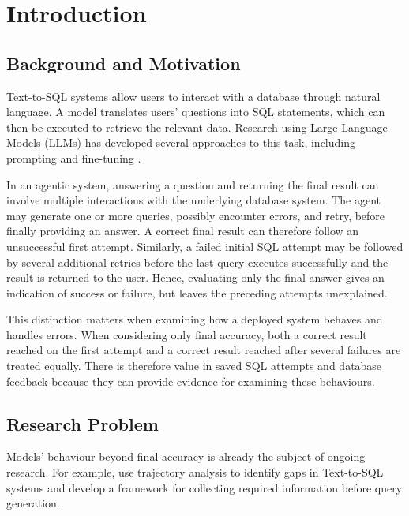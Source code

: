 \section{Introduction}
\label{sec:introduction}

\subsection{Background and Motivation}
\label{sec:introduction-background}

Text-to-SQL systems allow users to interact with a database through natural language. 
A model translates users' questions into SQL statements, 
which can then be executed to retrieve the relevant data. 
Research using Large Language Models (LLMs) has developed several approaches to this task, 
including prompting and fine-tuning \citep{shi2025survey}.

In an agentic system, answering a question and returning the final result 
can involve multiple interactions with the underlying database system. 
The agent may generate one or more queries, 
possibly encounter errors, and retry, before finally providing an answer.
A correct final result can therefore follow an unsuccessful first attempt. 
Similarly, a failed initial SQL attempt may be followed by several additional retries 
before the last query executes successfully and the result is returned to the user.
Hence, evaluating only the final answer gives an 
indication of success or failure, but leaves the preceding attempts unexplained.

This distinction matters when examining how a deployed system behaves and handles errors.
When considering only final accuracy, both a correct result reached on the first attempt 
and a correct result reached after several failures are treated equally.
There is therefore value in saved SQL attempts and database feedback 
because they can provide evidence for examining these behaviours.

\subsection{Research Problem}
\label{sec:introduction-problem}

Models' behaviour beyond final accuracy 
is already the subject of ongoing research.
For example, \citet{yan2026bottleneck} use trajectory analysis 
to identify gaps in Text-to-SQL systems and develop a framework 
for collecting required information before query generation.


